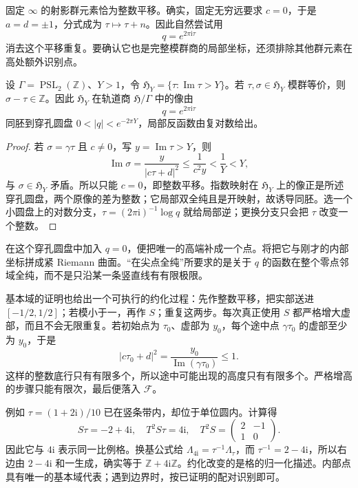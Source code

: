 固定 \(\infty\) 的射影群元素恰为整数平移。确实，固定无穷远要求 \(c=0\)，于是 \(a=d=\pm1\)，分式成为 \(\tau\mapsto\tau+n\)。因此自然尝试用
\[
 q=e^{2\pi\mathrm{i}\tau}
\]
消去这个平移重复。要确认它也是完整模群商的局部坐标，还须排除其他群元素在高处额外识别点。

\begin{proposition}[尖点附近的穿孔圆盘]\label{b3:prop:23-cusp-chart}
设 \(\Gamma=\operatorname{PSL}_2(\mathbb Z)\)、\(Y>1\)，令 \(\mathfrak H_Y=\{\tau:\operatorname{Im}\tau>Y\}\)。若 \(\tau,\sigma\in\mathfrak H_Y\) 模群等价，则 \(\sigma-\tau\in\mathbb Z\)。因此 \(\mathfrak H_Y\) 在轨道商 \(\mathfrak H/\Gamma\) 中的像由
\[
 q=e^{2\pi\mathrm{i}\tau}
\]
同胚到穿孔圆盘 \(0<|q|<e^{-2\pi Y}\)，局部反函数由复对数给出。
\end{proposition}
\begin{proof}
若 \(\sigma=\gamma\tau\) 且 \(c\ne0\)，写 \(y=\operatorname{Im}\tau>Y\)，则
\[
 \operatorname{Im}\sigma
 =\frac{y}{|c\tau+d|^2}
 \le\frac1{c^2y}<\frac1Y<Y,
\]
与 \(\sigma\in\mathfrak H_Y\) 矛盾。所以只能 \(c=0\)，即整数平移。指数映射在 \(\mathfrak H_Y\) 上的像正是所述穿孔圆盘，两个原像的差为整数；它局部双全纯且是开映射，故诱导同胚。选一个小圆盘上的对数分支，\(\tau=(2\pi\mathrm{i})^{-1}\log q\) 就给局部逆；更换分支只会把 \(\tau\) 改变一个整数。
\end{proof}

在这个穿孔圆盘中加入 \(q=0\)，便把唯一的高端补成一个点。将把它与刚才的内部坐标拼成紧 Riemann 曲面。“在尖点全纯”所要求的是关于 \(q\) 的函数在整个零点邻域全纯，而不是只沿某一条竖直线有有限极限。

\ProseParagraphBreak
基本域的证明也给出一个可执行的约化过程：先作整数平移，把实部送进 \([-1/2,1/2]\)；若模小于一，再作 \(S\)；重复这两步。每次真正使用 \(S\) 都严格增大虚部，而且不会无限重复。若初始点为 \(\tau_0\)、虚部为 \(y_0\)，每个途中点 \(\gamma\tau_0\) 的虚部至少为 \(y_0\)，于是
\[
 |c\tau_0+d|^2
 =\frac{y_0}{\operatorname{Im}(\gamma\tau_0)}\le1.
\]
这样的整数底行只有有限多个，所以途中可能出现的高度只有有限多个。严格增高的步骤只能有限次，最后便落入 \(\mathcal F\)。

例如 \(\tau=(1+2\mathrm{i})/10\) 已在竖条带内，却位于单位圆内。计算得
\[
 S\tau=-2+4\mathrm{i},\quad T^2S\tau=4\mathrm{i},
 \quad T^2S=\begin{pmatrix}2&-1\\1&0\end{pmatrix}.
\]
因此它与 \(4\mathrm{i}\) 表示同一比例格。换基公式给
\(\Lambda_{4\mathrm{i}}=\tau^{-1}\Lambda_\tau\)，而 \(\tau^{-1}=2-4\mathrm{i}\)，所以右边由 \(2-4\mathrm{i}\) 和一生成，确实等于 \(\mathbb Z+4\mathrm{i}\mathbb Z\)。约化改变的是格的归一化描述。内部点具有唯一的基本域代表；遇到边界时，按已证明的配对识别即可。

